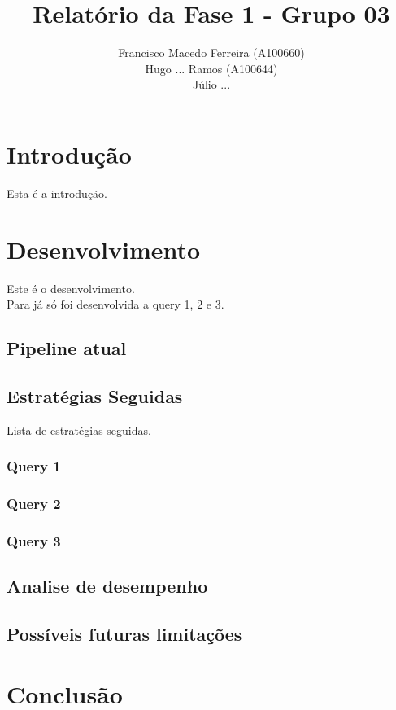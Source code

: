 \documentclass{article}
\title{Relatório da Fase 1 - Grupo 03}
\author{Francisco Macedo Ferreira (A100660)\\Hugo ... Ramos (A100644)\\Júlio ...}
\begin{document}
    \maketitle

    \section{Introdução}

    Esta é a introdução.

    \section{Desenvolvimento}

        Este é o desenvolvimento. 
        \\Para já só foi desenvolvida a query 1, 2 e 3.

        \subsection{Pipeline atual}

        \subsection{Estratégias Seguidas}

        Lista de estratégias seguidas.

        \subsubsection{Query 1}
        \subsubsection{Query 2}
        \subsubsection{Query 3}

        \subsection{Analise de desempenho}
        
        \subsection{Possíveis futuras limitações}

    \section{Conclusão}
\end{document}
